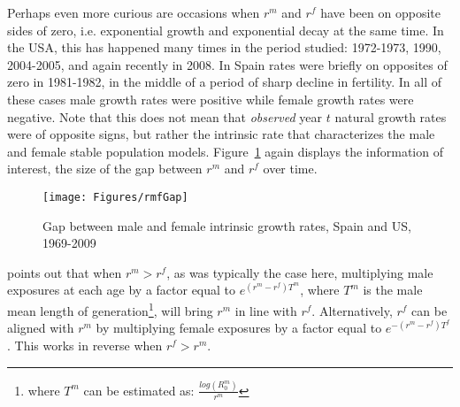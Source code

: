 Perhaps even more curious are occasions when $r^m$ and $r^f$ have been on
opposite sides of zero, i.e. exponential growth and exponential decay at the
same time. In the USA, this has happened many times in the period studied:
1972-1973, 1990, 2004-2005, and again recently in 2008. In Spain rates were 
briefly on opposites of zero in 1981-1982, in the middle of a period of sharp
decline in fertility. In all of these cases male growth rates were positive
while female growth rates were negative. Note that this does not mean that 
\textit{observed} year $t$ natural growth rates were of opposite signs, but
rather the intrinsic rate that characterizes the male and female stable
population models.
Figure~\ref{fig:rmfGap} again displays the information of interest, the size 
of the gap between $r^m$ and $r^f$ over time.

\begin{figure}[ht!]
        \centering  
          \caption{Gap between male and female intrinsic growth rates, Spain and
          US, 1969-2009}
           \texttt{[image: Figures/rmfGap]}
          \label{fig:rmfGap}
\end{figure}
\label{par:coalermrf}
\citet[p. 57]{coale1972growth} points out that when $r^m > r^f$, as was
typically the case here, multiplying male exposures at each age by a factor equal to
$e^{(r^m - r^f)T^m}$, where $T^m$ is the male mean length of
generation\footnote{where $T^m$ can be estimated as:
$\frac{log(R_0^m)}{r^m}$}, will bring $r^m$ in line with $r^f$. Alternatively,
$r^f$ can be aligned with $r^m$ by multiplying female exposures by a factor equal
 to $e^{-(r^m - r^f)T^f}$. This works in reverse when $r^f > r^m$.

 \FloatBarrier
